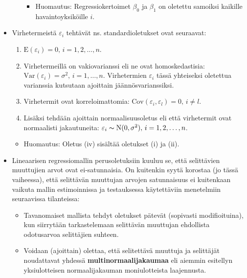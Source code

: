 \documentclass[
]{book}
\providecommand{\tightlist}{%
  \setlength{\itemsep}{0pt}\setlength{\parskip}{0pt}}
\begin{document}
\begin{itemize}
\begin{itemize}
    \begin{itemize}
    \tightlist
    \item
      Huomautus: Regressiokertoimet \(\beta_0\) ja \(\beta_1\) on oletettu samoiksi kaikille havaintoyksiköille \(i\).
    \end{itemize}
  \end{itemize}
\item
  Virhetermeistä \(\varepsilon_i\) tehtävät ns. standardioletukset ovat seuraavat:

  \begin{enumerate}
  \def\labelenumi{\roman{enumi})}
  \tightlist
  \item
    \(\text{E}(\varepsilon_i) = 0, \, i=1,2,\ldots,n\).
  \item
    Virhetermeillä on vakiovarianssi eli ne ovat homoskedastisia: \(\mathrm{Var}(\varepsilon_i)= \sigma^2, \, i=1,\ldots,n\). Virhetermien \(\varepsilon_i\) tässä yhteiseksi oletettua varianssia kutsutaan ajoittain jäännösvarianssiksi.
  \item
    Virhetermit ovat korreloimattomia: \(\mathrm{Cov}(\varepsilon_i, \varepsilon_l)=0, \, i \neq l\).
  \item
    Lisäksi tehdään ajoittain normaalisuusoletus eli että virhetermit ovat normaalisti jakautuneita: \(\varepsilon_i \thicksim \text{N}(0, \sigma^2), \, i=1,2,\ldots,n\).
  \end{enumerate}

  \begin{itemize}
  \tightlist
  \item
    Huomautus: Oletus (iv) sisältää oletukset (i) ja (ii).
  \end{itemize}
\item
  Lineaarisen regressiomallin perusoletuksiin kuuluu se, että selittävien muuttujien arvot ovat ei-satunnaisia. On kuitenkin syytä korostaa (jo tässä vaiheessa), että selittävän muuttujan arvojen satunnaisuus ei kuitenkaan vaikuta mallin estimoinnissa ja testauksessa käytettäviin menetelmiin seuraavissa tilanteissa:

  \begin{itemize}
  \tightlist
  \item
    Tavanomaiset mallista tehdyt oletukset pätevät (sopivasti modifioituina), kun siirrytään tarkastelemaan selittävän muuttujan ehdollista odotusarvoa selittäjien suhteen.
  \item
    Voidaan (ajoittain) olettaa, että selitettävä muuttuja ja selittäjät noudattavat yhdessä \textbf{multinormaalijakaumaa} eli aiemmin esitellyn yksiulotteisen normaalijakauman moniulotteista laajennusta.
  \end{itemize}
\end{itemize}
\end{document}
